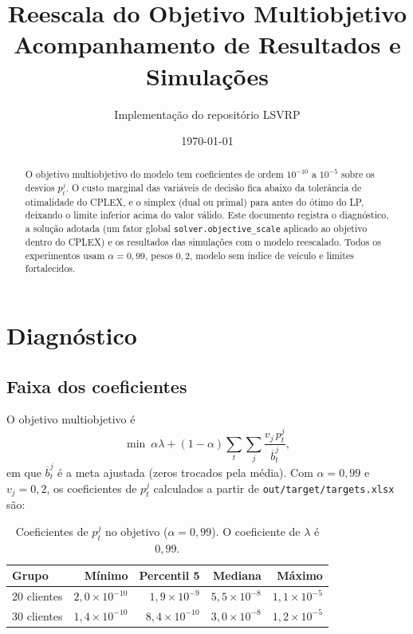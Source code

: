 \documentclass[11pt,a4paper]{article}
\title{Reescala do Objetivo Multiobjetivo\\
       Acompanhamento de Resultados e Simulações}
\author{Implementação do repositório LSVRP}
\date{\today}
\newcommand{\tb}[1]{\overline{b}_{#1}}
\begin{document}
\maketitle

\begin{abstract}
\sloppy
O objetivo multiobjetivo do modelo tem coeficientes de ordem $10^{-10}$ a
$10^{-5}$ sobre os desvios $p_t^j$. O custo marginal das variáveis de decisão
fica abaixo da tolerância de otimalidade do CPLEX, e o simplex (dual ou
primal) para antes do ótimo do LP, deixando o limite inferior acima do valor
válido. Este documento registra o diagnóstico, a solução adotada (um fator
global \texttt{solver.objective\_scale} aplicado ao objetivo dentro do CPLEX) e
os resultados das simulações com o modelo reescalado. Todos os experimentos
usam $\alpha=0{,}99$, pesos $0{,}2$, modelo sem índice de veículo e limites
fortalecidos.
\end{abstract}

\section{Diagnóstico}

\subsection{Faixa dos coeficientes}

O objetivo multiobjetivo é
\begin{equation}
  \min\ \alpha\lambda+(1-\alpha)\sum_{t}\sum_{j}\frac{v_j\,p_t^j}{\tb{t}^j},
\end{equation}
em que $\tb{t}^j$ é a meta ajustada (zeros trocados pela média). Com
$\alpha=0{,}99$ e $v_j=0{,}2$, os coeficientes de $p_t^j$ calculados a partir de
\texttt{out/target/targets.xlsx} são:

\begin{table}[h]
  \centering
  \begin{tabular}{lrrrr}
    \toprule
    Grupo & Mínimo & Percentil 5 & Mediana & Máximo\\
    \midrule
    20 clientes & $2{,}0\times10^{-10}$ & $1{,}9\times10^{-9}$ & $5{,}5\times10^{-8}$ & $1{,}1\times10^{-5}$\\
    30 clientes & $1{,}4\times10^{-10}$ & $8{,}4\times10^{-10}$ & $3{,}0\times10^{-8}$ & $1{,}2\times10^{-5}$\\
    \bottomrule
  \end{tabular}
  \caption{Coeficientes de $p_t^j$ no objetivo ($\alpha=0{,}99$). O coeficiente
  de $\lambda$ é $0{,}99$.}
\end{table}
\end{document}
